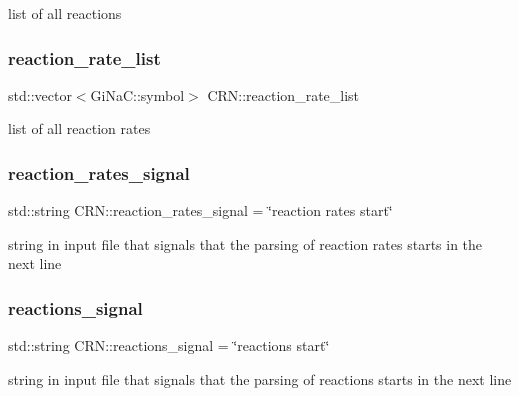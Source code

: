 list of all reactions 

\mbox{\label{classCRN_af6de0bba7b97843f9c95e4e849fa9543}} 
\subsubsection{\texorpdfstring{reaction\+\_\+rate\+\_\+list}{reaction\_rate\_list}}
{\footnotesize\ttfamily std\+::vector$<$Gi\+Na\+C\+::symbol$>$ C\+R\+N\+::reaction\+\_\+rate\+\_\+list}



list of all reaction rates 

\mbox{\label{classCRN_a90756566693c70e08991c37c3ec21d38}} 
\subsubsection{\texorpdfstring{reaction\+\_\+rates\+\_\+signal}{reaction\_rates\_signal}}
{\footnotesize\ttfamily std\+::string C\+R\+N\+::reaction\+\_\+rates\+\_\+signal = \char`\"{}reaction rates start\char`\"{}}



string in input file that signals that the parsing of reaction rates starts in the next line 

\mbox{\label{classCRN_aa71d714d674ed916e9acc03b7c6163ef}} 
\subsubsection{\texorpdfstring{reactions\+\_\+signal}{reactions\_signal}}
{\footnotesize\ttfamily std\+::string C\+R\+N\+::reactions\+\_\+signal = \char`\"{}reactions start\char`\"{}}



string in input file that signals that the parsing of reactions starts in the next line 

\mbox{\label{classCRN_ab1e7f09d6d0cf644190d36f14e689f49}} 
